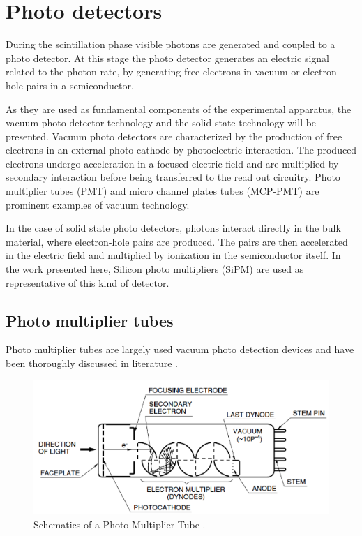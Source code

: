
\chapter{Photo detectors}
During the scintillation phase visible photons are generated and coupled to a photo detector. At this stage the photo detector generates an electric signal related to the photon rate, by generating free electrons in vacuum or electron-hole pairs in a semiconductor.

As they are used as fundamental components of the experimental apparatus, the vacuum photo detector technology and the solid state technology will be presented.
Vacuum photo detectors are characterized by the production of free electrons in an external photo cathode by photoelectric interaction. The produced electrons undergo acceleration in a focused electric field and are multiplied by secondary interaction before being transferred to the read out circuitry. Photo multiplier tubes (PMT) and micro channel plates tubes  (MCP-PMT) are prominent examples of vacuum technology.
  
In the case of solid state photo detectors, photons interact directly in the bulk material, where electron-hole pairs are produced. The pairs are then accelerated in the electric field and multiplied by ionization in the semiconductor itself. In the work presented here, Silicon photo multipliers (SiPM) are used as representative of this kind of detector.     

\section{Photo multiplier tubes}

Photo multiplier tubes are largely used vacuum photo detection devices and have been thoroughly discussed in literature \cite{Knoll2000}. 
\begin{figure}[htbp]
\begin{center}
\includegraphics[width=12cm]{../Pictures/Chapter_3/PMT.png}
\end{center}
\caption[PMT schematics]{Schematics of a Photo-Multiplier Tube \cite{Hama2006}.}
\label{fig:PMT_schematics}
\end{figure}


